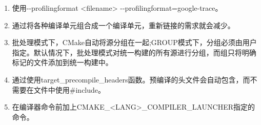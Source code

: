 

\begin{enumerate}
\item 
使用-{}-profilingformat <filename> -{}-profilingformat=google-trace。

\item
通过将各种编译单元组合成一个编译单元，重新链接的需求就会减少。

\item 
批处理模式下，CMake自动将源分组在一起;GROUP模式下，分组必须由用户指定。默认情况下，批处理模式对统一构建的所有源进行分组，而组只将明确标记的文件添加到统一构建中。

\item 
通过使用target\_precompile\_headers函数。预编译的头文件会自动包含，而不需要在文件中使用\#include。

\item 
在编译器命令前加上CMAKE\_<LANG>\_COMPILER\_LAUNCHER指定的命令。
\end{enumerate}